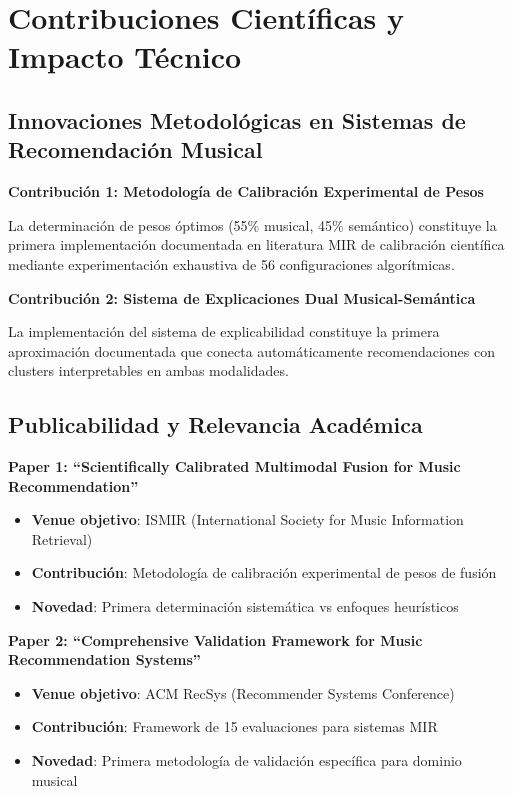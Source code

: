 \documentclass[12pt,a4paper]{report}
\begin{document}
\section{Contribuciones Científicas y Impacto Técnico}

\subsection{Innovaciones Metodológicas en Sistemas de Recomendación Musical}

\textbf{Contribución 1: Metodología de Calibración Experimental de Pesos}

La determinación de pesos óptimos (55\% musical, 45\% semántico) constituye la primera implementación documentada en literatura MIR de calibración científica mediante experimentación exhaustiva de 56 configuraciones algorítmicas.

\textbf{Contribución 2: Sistema de Explicaciones Dual Musical-Semántica}

La implementación del sistema de explicabilidad constituye la primera aproximación documentada que conecta automáticamente recomendaciones con clusters interpretables en ambas modalidades.

\subsection{Publicabilidad y Relevancia Académica}

\textbf{Paper 1: ``Scientifically Calibrated Multimodal Fusion for Music Recommendation''}
\begin{itemize}
    \item \textbf{Venue objetivo}: ISMIR (International Society for Music Information Retrieval)
    \item \textbf{Contribución}: Metodología de calibración experimental de pesos de fusión
    \item \textbf{Novedad}: Primera determinación sistemática vs enfoques heurísticos
\end{itemize}

\textbf{Paper 2: ``Comprehensive Validation Framework for Music Recommendation Systems''}
\begin{itemize}
    \item \textbf{Venue objetivo}: ACM RecSys (Recommender Systems Conference)
    \item \textbf{Contribución}: Framework de 15 evaluaciones para sistemas MIR
    \item \textbf{Novedad}: Primera metodología de validación específica para dominio musical
\end{itemize}
\end{document}
